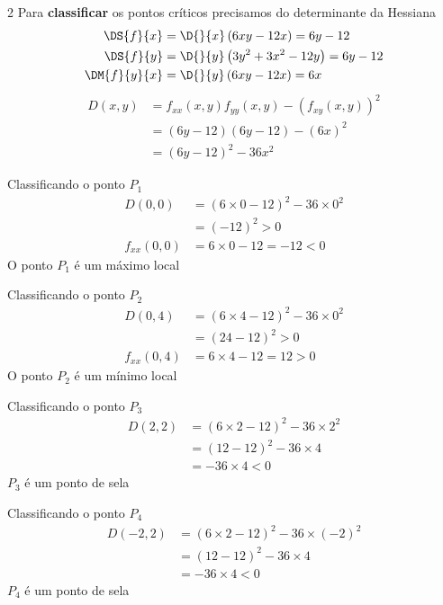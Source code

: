 \documentclass[a4paper,12pt,fleqn]{article}
\begin{document}
\begin{answer}
\begin{multicols*}{2}
  Para \textbf{classificar} os pontos críticos precisamos
  do determinante da Hessiana
  \begin{align*}
    \DS{f}{x}    & = \D{}{x}\left(6xy - 12x\right)         = 6y - 12 \\
    \DS{f}{y}    & = \D{}{y}\left(3y^2 + 3x^2 - 12y\right) = 6y - 12 \\
    \DM{f}{y}{x} & = \D{}{y}\left(6xy - 12x\right)         = 6x
  \end{align*}
  \begin{align*}
    D(x, y)
    & = f_{xx}(x, y) f_{yy}(x, y) - \left(f_{xy}(x, y)\right)^2 \\
    & = (6y-12)(6y-12) - (6x)^2 \\
    & = (6y-12)^2 - 36x^2
  \end{align*}

  Classificando o ponto $P_1$
  \begin{align*}
    D\left(0, 0\right)
    & = (6\times 0-12)^2 - 36\times 0^2 \\
    & = (-12)^2 > 0 \\
    f_{xx}\left(0, 0\right)
    & = 6\times 0 - 12 = -12 < 0
  \end{align*}
  O ponto $P_1$ é um máximo local

  Classificando o ponto $P_2$
  \begin{align*}
    D\left(0, 4\right)
    & = (6\times 4-12)^2 - 36\times 0^2 \\
    & = (24-12)^2 > 0 \\
    f_{xx}\left(0, 4\right)
    & = 6\times 4 - 12 = 12 > 0
  \end{align*}
  O ponto $P_2$ é um mínimo local

  Classificando o ponto $P_3$
  \begin{align*}
    D\left(2, 2\right)
    & = (6\times 2-12)^2 - 36\times 2^2 \\
    & = (12-12)^2 - 36\times 4 \\
    & = -36\times 4 < 0
  \end{align*}
  $P_3$ é um ponto de sela

  Classificando o ponto $P_4$
  \begin{align*}
    D\left(-2, 2\right)
    & = (6\times 2-12)^2 - 36\times(-2)^2 \\
    & = (12-12)^2 - 36\times 4 \\
    & = -36\times 4 < 0
  \end{align*}
  $P_4$ é um ponto de sela
\end{multicols*}
\end{answer}
\end{document}
